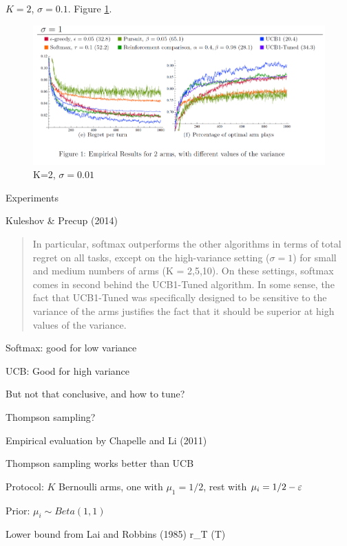 \documentclass[english]{article}
\begin{document}
\item {$K=2$, $\sigma=0.1$}. Figure \ref{K=2.sigma=0.01}.
\begin{figure}[h!]
\begin{center}
\includegraphics[width=0.7\paperwidth]{k=2.sigma=0.01}
    \caption{K=2, $\sigma=0.01$}
    \label{K=2.sigma=0.01}
\end{center}
\end{figure}




\item {Experiments}
\bitem
\item Kuleshov \& Precup (2014)
\begin{quote}
In particular, softmax outperforms the other algorithms in terms of total regret on all tasks, except on the high-variance setting ($\sigma = 1$) for small and medium numbers of arms (K = 2,5,10). On these settings, softmax comes in second behind the UCB1-Tuned algorithm. In some sense, the fact that UCB1-Tuned was specifically designed to be sensitive to the variance of the arms justifies the fact
that it should be superior at high values of the variance.
\end{quote}
\item Softmax: good for low variance
\item UCB: Good for high variance
\item But not that conclusive, and how to tune?
\eitem



\item {Thompson sampling?}
\bitem
\item Empirical evaluation by Chapelle and Li (2011)
\item Thompson sampling works better than UCB
\item Protocol: $K$ Bernoulli arms, one with $\mu_1=1/2$, rest with $\mu_i=1/2-\varepsilon$
\item Prior: $\mu_i\sim Beta(1,1)$
\item Lower bound from  Lai and Robbins (1985)
\beqs r_T \ge \log(T)\cdot
\left[ \sum_{i=1}^K \frac{\Delta_i}{D_{KL}(\mu_i\|\mu^*)}+o(1)\right]
\eeqs
\eitem
\end{document}
